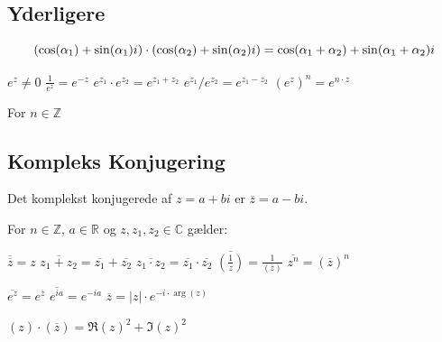 %
%


\subsection{Yderligere}
\[
    (\cos(\alpha_1) + \sin(\alpha_1) i) \cdot (\cos(\alpha_2) + \sin(\alpha_2) i) = \cos(\alpha_1 + \alpha_2) + \sin(\alpha_1 + \alpha_2) i \\
\]

\begin{center}
    $e^z \neq 0$ \hfill
    $\frac{1}{e^z} = e^{-z}$ \hfill
    $e^{z_1} \cdot e^{z_2} = e^{z_1 + z_2}$ \hfill
    $e^{z_1}/e^{z_2} = e^{z_1 - z_2}$ \hfill
    $(e^{z})^n = e^{n \cdot z}$
\end{center}

For $n \in \mathbb{Z}$

\subsection{Kompleks Konjugering}

Det komplekst konjugerede af $z=a+bi$ er $\overline{z}=a-bi$.

For $n \in \mathbb{Z}$, $a \in \mathbb{R}$ og $z, z_1, z_2 \in \mathbb{C}$ gælder:

\begin{center}
    $\overline{\overline{z}} = z$ \hfill
    $\overline{z_1 + z_2} = \overline{z_1} + \overline{z_2}$ \hfill
    $\overline{z_1 \cdot z_2} = \overline{z_1} \cdot \overline{z_2}$ \hfill
    $\overline{\left( \frac{1}{z} \right)} = \frac{1}{(\overline{z})}$ \hfill
    $\overline{z^n} = (\overline{z})^n$ \hfill
\end{center}

\begin{center}
    $\overline{e^z} = e^{\overline{z}}$ \hfill
    $\overline{e^{ia}} = e^{-ia}$ \hfill
    $\overline{z} = |z| \cdot e^{-i \cdot \arg(z)}$
\end{center}

\begin{center}
    $(z) \cdot (\overline{z}) = {\Re(z)}^2 + {\Im(z)}^2$
\end{center}
